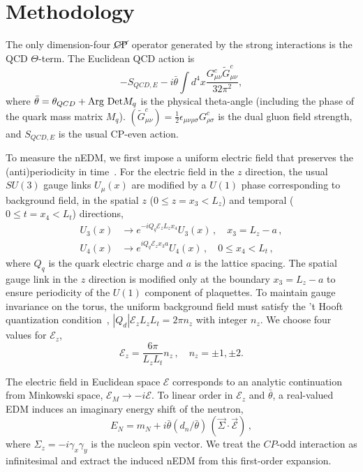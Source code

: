 \documentclass[aps,prl,twocolumn,superscriptaddress,nofootinbib]{revtex4-2}
\newcommand{\CP}{{CP}}
\newcommand{\CPV}{{\cancel{\rm CP}}}
\newcommand{\mcE}{{\mathcal E}}
\begin{document}
\section{Methodology}
The only dimension-four $\CPV$ operator generated by the strong interactions is the QCD $\Theta$-term.
The Euclidean QCD action is~\cite{Blum:2026hul}
\begin{equation}
\label{eq:actionME}
-S_{QCD,E}-i\bar{\theta}\int d^4x \frac{G^c_{\mu\nu}  {\widetilde G^c_{\mu\nu}} }{32\pi^2}, 
\end{equation}
where $\bar{\theta} = \theta_{QCD} + {\rm Arg\ Det}M_q$ is the physical theta-angle (including the phase of the quark mass matrix $M_q$).
$({\widetilde G^c_{\mu\nu}}) = \frac12\epsilon_{\mu\nu\rho\sigma} G^c_{\rho\sigma}$ is the dual gluon field strength, and
$S_{QCD,E}$ is the usual CP-even action.

To measure the nEDM, we first impose a uniform electric field that preserves the (anti)periodicity in time~\cite{Detmold:2009dx}.
For the electric field in the $z$ direction,
the usual $SU(3)$ gauge links $U_\mu(x)$ are modified by a $U(1)$ phase corresponding to background field, in the
spatial $z$ ($0\le z=x_3 < L_z$) and temporal ($0\le t=x_4 < L_t$) directions, 
\begin{equation}
\label{eq:gauge}
\begin{aligned}
U_3(x) &\rightarrow e^{-iQ_q\mcE_zL_zx_4} U_3(x)\,,
\quad x_3 = L_z-a\,,
\\
U_4(x) &\rightarrow e^{iQ_q\mcE_zx_3a} U_4(x)\,,
\quad 0\le x_4 < L_t\,,
\end{aligned}
\end{equation}
where $Q_q$ is the quark electric charge and $a$ is the lattice spacing.
The spatial gauge link in the $z$ direction is modified 
only at the boundary $x_3=L_z-a$ to ensure periodicity of the $U(1)$ component of plaquettes.
To maintain gauge invariance on the torus, the uniform background field must satisfy the ’t Hooft quantization
condition~\cite{tHooft:1979rtg,tHooft:1981nnx}, 
$|Q_d|\mcE_z L_zL_t=2\pi n_z$ with integer $n_z$.
We choose four values for $\mcE_z$,
\begin{equation}
\label{eq:ezc}
\mcE_z=\frac{6\pi}{L_z L_t}n_{z}\,, \quad n_{z}=\pm1,\pm2.  
\end{equation}

The electric field in Euclidean space $\mcE$ corresponds to an analytic continuation from Minkowski space, $\mcE_M\rightarrow -i\mcE$. 
To linear order in $\mcE_z$ and $\bar\theta$, a real-valued EDM induces an imaginary energy shift of the neutron,
\begin{equation}
\label{eq:eneshift}
E_N = m_N + i \bar{\theta} (d_n/\bar{\theta})\,(\vec\Sigma \cdot \vec\mcE)\,,
\end{equation}
where $\Sigma_z=-i\gamma_x\gamma_y$ is the nucleon spin vector.  
We treat the $\CP$-odd interaction as infinitesimal and extract the induced nEDM from this first-order expansion.
\end{document}
